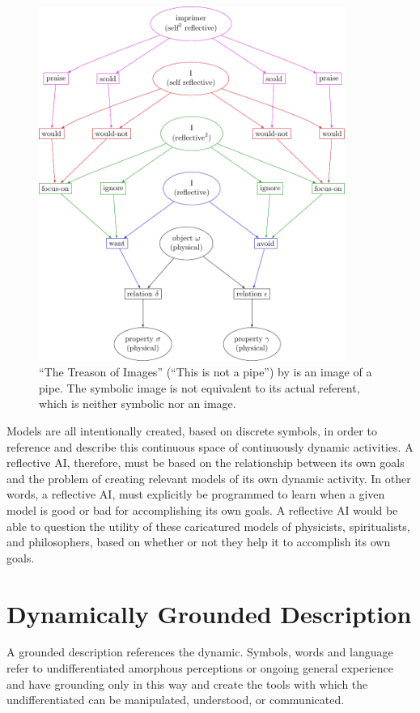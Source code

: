 \begin{figure}
\center
\includegraphics[width=10cm]{gfx/magritte_pipe}
\caption[``The Treason of Images'' (``This is not a pipe'') by
  \cite{magritte:1919} is an image of a pipe.]{``The Treason of
  Images'' (``This is not a pipe'') by \cite{magritte:1919} is an
  image of a pipe.  The symbolic image is not equivalent to its actual
  referent, which is neither symbolic nor an image.}
\label{figure:magritte_pipe}
\end{figure}

Models are all intentionally created, based on discrete symbols, in
order to reference and describe this continuous space of continuously
dynamic activities.  A reflective AI, therefore, must be based on the
relationship between its own goals and the problem of creating
relevant models of its own dynamic activity.  In other words, a
reflective AI, must explicitly be programmed to learn when a given
model is good or bad for accomplishing its own goals.  A reflective AI
would be able to question the utility of these caricatured models of
physicists, spiritualists, and philosophers, based on whether or not
they help it to accomplish its own goals.

\section{Dynamically Grounded Description}

A grounded description references the dynamic.  Symbols, words and
language refer to undifferentiated amorphous perceptions or ongoing
general experience and have grounding only in this way and create the
tools with which the undifferentiated can be manipulated, understood,
or communicated.

